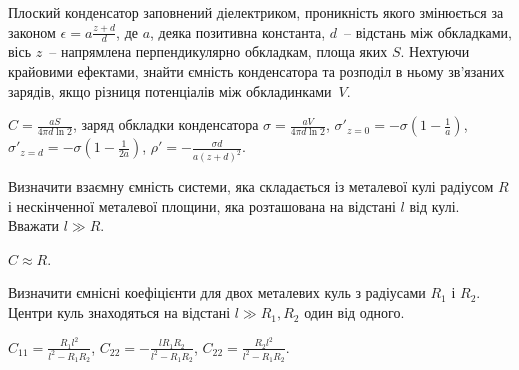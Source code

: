 \begin{problem}%
Плоский конденсатор заповнений діелектриком, проникність якого змінюється за законом $\epsilon = a\frac{z + d}{d}$, де $a$, деяка позитивна константа, $d$~-- відстань між обкладками, вісь $z$~-- напрямлена перпендикулярно обкладкам, площа яких $S$. Нехтуючи крайовими ефектами, знайти ємність конденсатора та розподіл в ньому зв'язаних зарядів, якщо різниця потенціалів між обкладинками~$V$.
\begin{solution}
	$C = \frac{aS}{4\pi d\ln2}$, заряд обкладки конденсатора $\sigma = \frac{aV}{4\pi d\ln2}$, $\sigma'_{z=0} = -\sigma \left( 1 - \frac{1}{a} \right) $, $\sigma'_{z=d} = -\sigma \left( 1 - \frac{1}{2a} \right) $, $\rho' = -\frac{\sigma d}{a(z + d)^2}$.
\end{solution}
\end{problem}

\begin{problem}
Визначити взаємну ємність системи, яка складається із металевої кулі радіусом $R$ і нескінченної металевої площини, яка  розташована на відстані $l$ від кулі. Вважати $l \gg R$.
\begin{solution}
	$C \approx R$.
\end{solution}
\end{problem}

\begin{problem}
    Визначити ємнісні коефіцієнти для двох металевих куль з радіусами $R_1$ і $R_2$. Центри куль знаходяться на відстані $l \gg R_1,R_2$ один від одного.
\begin{solution}
	$C_{11} = \frac{R_1 l^2}{l^2 - R_1R_2}$, $C_{22}  = -\frac{lR_1R_2}{l^2 - R_1R_2}$, $C_{22} = \frac{R_2 l^2}{l^2 - R_1R_2}$.
\end{solution}
\end{problem}

